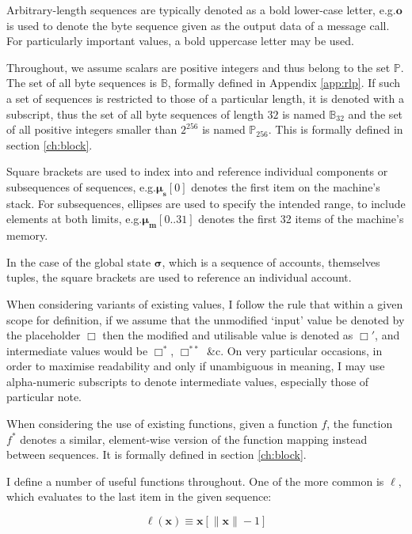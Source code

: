 \documentclass[9pt,oneside]{amsart}
\makeatletter
\newcommand{\linkdest}[1]{\Hy@raisedlink{\hypertarget{#1}{}}}
\newcommand*\eg{e.g.\@\xspace}
\makeatother
\begin{document}
\begin{multicols}{2}
Arbitrary-length sequences are typically denoted as a bold lower-case letter, \eg $\mathbf{o}$ is used to denote the byte sequence given as the output data of a message call. For particularly important values, a bold uppercase letter may be used.

Throughout, we assume scalars are positive integers and thus belong to the set $\mathbb{P}$. The set of all byte sequences is $\mathbb{B}$, formally defined in Appendix \ref{app:rlp}. If such a set of sequences is restricted to those of a particular length, it is denoted with a subscript, thus the set of all byte sequences of length $32$ is named $\mathbb{B}_{32}$ and the set of all positive integers smaller than $2^{256}$ is named $\mathbb{P}_{256}$. This is formally defined in section \ref{ch:block}.

Square brackets are used to index into and reference individual components or subsequences of sequences, \eg $\boldsymbol{\mu}_{\mathbf{s}}[0]$ denotes the first item on the machine's stack. For subsequences, ellipses are used to specify the intended range, to include elements at both limits, \eg $\boldsymbol{\mu}_{\mathbf{m}}[0..31]$ denotes the first 32 items of the machine's memory.

In the case of the global state $\boldsymbol{\sigma}$, which is a sequence of accounts, themselves tuples, the square brackets are used to reference an individual account.

When considering variants of existing values, I follow the rule that within a given scope for definition, if we assume that the unmodified `input' value be denoted by the placeholder $\Box$ then the modified and utilisable value is denoted as $\Box'$, and intermediate values would be $\Box^*$,  $\Box^{**}$ \&c. On very particular occasions, in order to maximise readability and only if unambiguous in meaning, I may use alpha-numeric subscripts to denote intermediate values, especially those of particular note.

When considering the use of existing functions, given a function $f$, the function \hyperlink{general_element_wise_sequence_transformation_f_pow_asterisk}{$f^*$} denotes a similar, element-wise version of the function mapping instead between sequences. It is formally defined in section \ref{ch:block}.

I define a number of useful functions throughout. \linkdest{ell}One of the more common is $\ell$, which evaluates to the last item in the given sequence:

\begin{equation}
\ell(\mathbf{x}) \equiv \mathbf{x}[\lVert \mathbf{x} \rVert - 1]
\end{equation}


\end{multicols}
\end{document}
